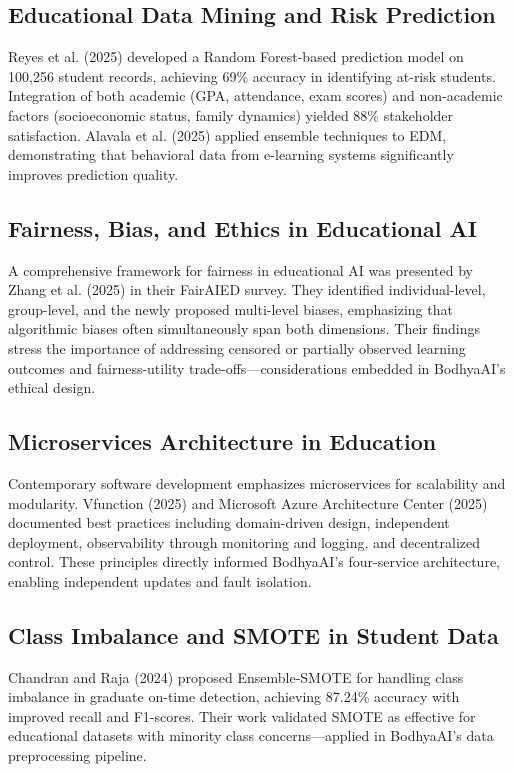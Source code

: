 \documentclass[conference]{IEEEtran}
\begin{document}
\subsection{Educational Data Mining and Risk Prediction}
Reyes et al. (2025) developed a Random Forest-based prediction model on 100,256 student records, achieving 69\% accuracy in identifying at-risk students. Integration of both academic (GPA, attendance, exam scores) and non-academic factors (socioeconomic status, family dynamics) yielded 88\% stakeholder satisfaction. Alavala et al. (2025) applied ensemble techniques to EDM, demonstrating that behavioral data from e-learning systems significantly improves prediction quality.

\subsection{Fairness, Bias, and Ethics in Educational AI}
A comprehensive framework for fairness in educational AI was presented by Zhang et al. (2025) in their FairAIED survey. They identified individual-level, group-level, and the newly proposed multi-level biases, emphasizing that algorithmic biases often simultaneously span both dimensions. Their findings stress the importance of addressing censored or partially observed learning outcomes and fairness-utility trade-offs—considerations embedded in BodhyaAI's ethical design.

\subsection{Microservices Architecture in Education}
Contemporary software development emphasizes microservices for scalability and modularity. Vfunction (2025) and Microsoft Azure Architecture Center (2025) documented best practices including domain-driven design, independent deployment, observability through monitoring and logging, and decentralized control. These principles directly informed BodhyaAI's four-service architecture, enabling independent updates and fault isolation.

\subsection{Class Imbalance and SMOTE in Student Data}
Chandran and Raja (2024) proposed Ensemble-SMOTE for handling class imbalance in graduate on-time detection, achieving 87.24\% accuracy with improved recall and F1-scores. Their work validated SMOTE as effective for educational datasets with minority class concerns—applied in BodhyaAI's data preprocessing pipeline.
\end{document}
